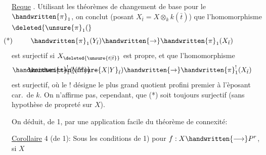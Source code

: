 \uline{Reque} . Utilisant les théorèmes de changement de base pour le $\handwritten{\pi}_1$, on conclut  (posant $X_{\bar{t}}=X\otimes_k k(\bar{t})$) que l'homomorphisme $\deleted{\unsure{\pi}_1(}$
\[
\handwritten{\pi}_1(Y_{\bar{t}})\handwritten{\rightarrow}\handwritten{\pi}_1(X_{\bar{t}})\tag*{\makebox[0pt][r]{\makebox[\linewidth][l]{(*)}}}
\]
est surjectif si $X_{\deleted{\unsure{t|\bar{t}}}}$ est propre, et que l'homomorphisme
\[
\handwritten{\pi}_1^{!}(\unsure{X|Y}_{\bar{t}})\handwritten{\rightarrow}\handwritten{\pi}_1^{!}(X_{\bar{t}})\tag*{\makebox[0pt][r]{\makebox[\linewidth][l]{\handwritten{(**)}}}}
\]
est surjectif, où le ! désigne le plus grand quotient profini premier à l'èposant car.\ de $k$. On n'affirme pas, cependant, que (*) soit toujours surjectif (sans hypothèse de propreté sur $X$).

On déduit, de 1, par une application facile du théorème de connexité:

\uline{Corollaire} 4 (de 1): Sous les conditions de 1) pour $f:X\handwritten{\longrightarrow}P^r$, si $X$
